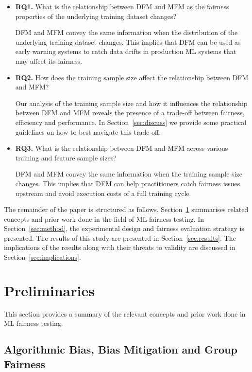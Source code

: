 \documentclass[sigconf,review,anonymous]{acmart}
\begin{document}
\begin{itemize}
  \item{\textbf{RQ1.}} What is the relationship between DFM and MFM as the
    fairness properties of the underlying training dataset changes?

    DFM and MFM convey the same information when the distribution of
    the underlying training dataset changes. This implies that DFM can
    be used as early warning systems to catch data drifts in
    production ML systems that may affect its fairness.

  \item{\textbf{RQ2.}} How does the training sample size affect the
    relationship between DFM and MFM?

    Our analysis of the training sample size and how it influences the
    relationship between DFM and MFM reveals the presence of
    a trade-off between fairness, efficiency and performance. In
    Section \ref{sec:discuss} we provide some practical guidelines on
    how to best navigate this trade-off.

  \item{\textbf{RQ3.}} What is the relationship between DFM and MFM across
    various training and feature sample sizes?

    DFM and MFM convey the same information when the training sample
    size changes. This implies that DFM can help practitioners catch
    fairness issues upstream and avoid execution costs of a full
    training cycle.
\end{itemize}

The remainder of the paper is structured as follows.
Section \ref{sec:related} summarises related concepts and prior work
done in the field of ML fairness testing. In Section \ref{sec:method},
the experimental design and fairness evaluation strategy is presented.
The results of this study are presented in Section \ref{sec:results}.
The implications of the results along with their threats to validity
are discussed in Section \ref{sec:implications}.

\section{Preliminaries}\label{sec:related}

This section provides a summary of the relevant concepts and prior
work done in ML fairness testing.

\subsection{Algorithmic Bias, Bias Mitigation and Group Fairness}\label{sec:bias-fairness}
\end{document}
